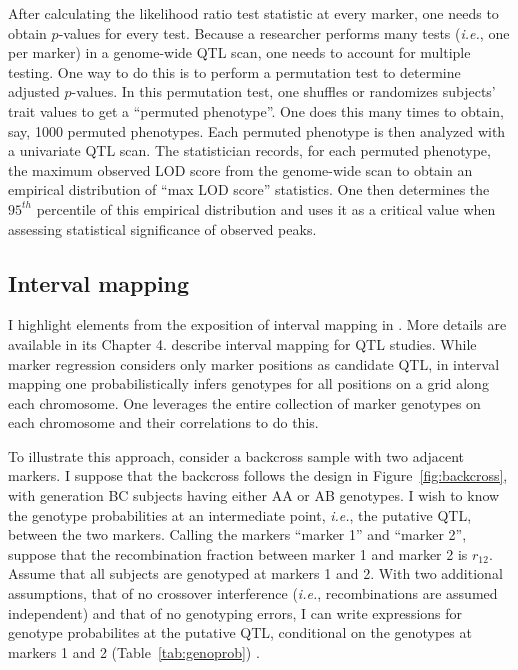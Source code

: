 \documentclass[oneside]{book}\usepackage[]{graphicx}\usepackage[]{color}
\begin{document}
After calculating the likelihood ratio test statistic at every marker,
one needs to obtain $p$-values for every test. Because a researcher performs many
tests (\emph{i.e.}, one per marker) in a genome-wide QTL scan, one needs to account for multiple testing. One way to do this is to perform
a permutation test to determine adjusted $p$-values. In this permutation test, one
shuffles or randomizes subjects' trait values to get a ``permuted phenotype''. One
does this many times to obtain, say, 1000 permuted phenotypes. Each permuted phenotype
is then analyzed with a univariate QTL scan. The statistician records, for
each permuted phenotype, the maximum observed LOD score from the genome-wide scan to
obtain an empirical distribution of ``max LOD score'' statistics. One then
determines the $95^{th}$ percentile of this empirical distribution and uses it as 
a critical value when assessing statistical significance of observed peaks.

\subsection{Interval mapping}\label{sec:interval-mapping}

I highlight elements from the exposition of interval mapping in \citet{broman2009guide}. More details are available in its Chapter 4. \citet{lander1989mapping} describe interval mapping for QTL studies. While marker 
regression considers only marker positions as candidate QTL, in interval mapping 
one probabilistically infers genotypes for all positions on a grid 
along each chromosome. One leverages the entire collection of marker genotypes on each chromosome and their correlations to do this. 

To illustrate this approach, consider a backcross sample with two adjacent markers. I suppose 
that the backcross follows the design in Figure~\ref{fig:backcross}, with generation BC subjects 
having either AA or AB genotypes. I wish to know the genotype probabilities at an intermediate 
point, \emph{i.e.}, the putative QTL, between the two markers. Calling the markers ``marker 1'' 
and ``marker 2'', suppose that the recombination fraction between marker 1 and marker 2 is 
$r_{12}$. Assume that all subjects are genotyped at markers 1 and 2. With two additional 
assumptions, that of no crossover interference (\emph{i.e.}, recombinations are 
assumed independent) and that of no genotyping errors, I can write 
expressions for genotype probabilites at the putative QTL, conditional on the genotypes at 
markers 1 and 2 (Table~\ref{tab:genoprob}) \citep{broman2009guide}.
\end{document}
